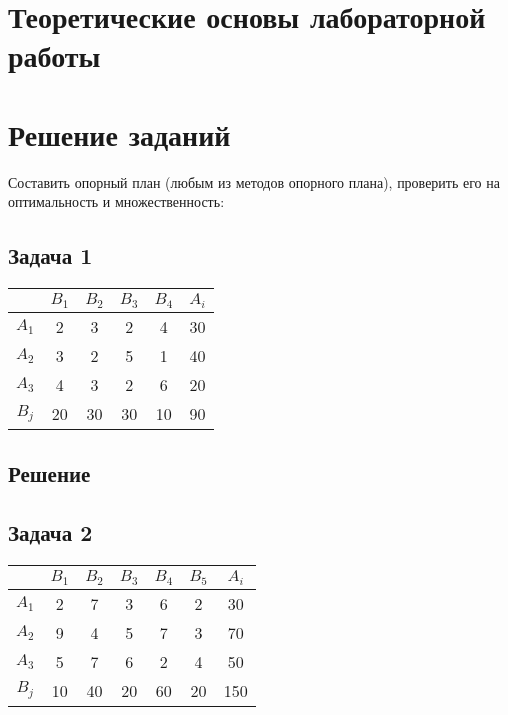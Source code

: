 \documentclass[12pt]{article}
\begin{document}
\section*{Теоретические основы лабораторной работы}

\newpage
\section*{Решение заданий}

Составить опорный план (любым из методов опорного плана), проверить его на
оптимальность и множественность: 

\subsection*{Задача 1}

\begin{table}[h!]
\begin{center}
\begin{tabular}{|c|c|c|c|c|c|}
\hline
           & $B_1$ & $B_2$ & $B_3$ & $B_4$ & $A_i$	\\
\hline
 $A_1$ & 2 & 3 & 2 & 4 & 30	\\
\hline
 $A_2$ & 3 & 2 & 5 & 1 & 40	\\
\hline
 $A_3$ & 4 & 3 & 2 & 6 & 20	\\ 
\hline
 $B_j$ & 20 & 30 & 30 & 10 & 90	\\
\hline
\end{tabular}
\end{center}
\end{table} 
\subsection*{Решение}

\subsection*{Задача 2}

\begin{table}[h!]
\begin{center}
\begin{tabular}{|c|c|c|c|c|c|c|}
\hline
           & $B_1$ & $B_2$ & $B_3$ & $B_4$ & $B_5$ & $A_i$	\\
\hline
 $A_1$ & 2 & 7 & 3 & 6 & 2 & 30	\\
\hline
 $A_2$ & 9 & 4 & 5 & 7 & 3 & 70	\\
\hline
 $A_3$ & 5 & 7 & 6 & 2 & 4 & 50	\\ 
\hline
 $B_j$ & 10 & 40 & 20 & 60 & 20 & 150	\\
\hline
\end{tabular}
\end{center}
\end{table} 
\end{document}
